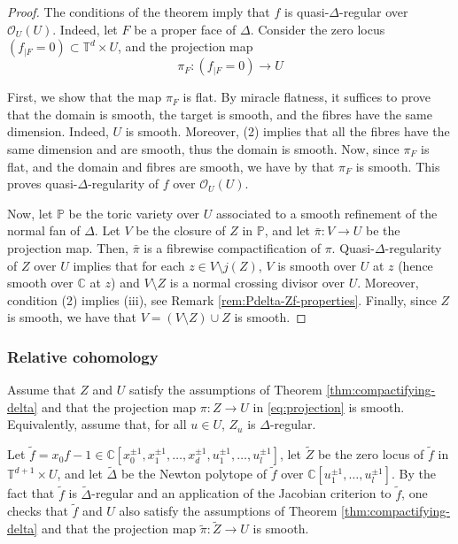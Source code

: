 \documentclass[11pt, reqno]{amsart}
\theoremstyle{plain}
\theoremstyle{definition}
\newcommand{\CC}{\mathbb{C}}
\newcommand{\OO}{\mathcal{O}}
\newcommand{\TT}{\mathbb{T}}
\newcommand{\bs}{}
\begin{document}
\begin{proof}
The conditions of the theorem imply that  $\bs f$ is quasi-$\Delta$-regular over $\OO_{\bs{U}}(\bs{U})$. Indeed, let $F$ be a 
proper 
face of $\Delta$. Consider the zero locus $(\bs f_{|F}=0) \subset \TT^d \times \bs U$, and the projection map 
\[{\bs \pi}_F \colon (\bs f_{|F}=0) \to \bs{U}\] 

First, we show that the map ${\bs \pi}_F$ is flat. 
By miracle flatness, it suffices to prove that the domain is smooth, the target is smooth, and the fibres have the same dimension. 
Indeed, $U$ is smooth. 
Moreover, (2) implies that all the fibres have the same dimension and are smooth, thus the domain is smooth. 
Now, since ${\bs \pi}_F$ is flat, and the domain and fibres are smooth, we have by \cite[Theorem 10.2]{Hart} that ${\bs \pi}_F$ is smooth. 
This proves quasi-$\Delta$-regularity of $\bs f$ over $\OO_{\bs{U}}(\bs{U})$.

Now, let $\mathbb{P}$ be the toric variety over $\bs{U}$ associated to a smooth refinement of the normal fan of $\Delta$. Let $\bs V$ be the closure of $\bs Z$ in $\mathbb{P}$, and let $\bar{\bs \pi} \colon \bs V \to \bs U$ be the projection map. Then, $\bar{\bs \pi}$  is a fibrewise compactification of $\bs \pi$. 
Quasi-$\Delta$-regularity of $\bs Z$ over $\bs U$ implies that for each $z \in \bs V \setminus j(Z)$, $V$ is smooth over $\bs U$ at $z$ (hence smooth over $\CC$ at $z$) and $V\setminus Z$ is a normal crossing divisor over $\bs U$. Moreover, condition (2) implies (iii), see Remark \ref{rem:Pdelta-Zf-properties}. 
Finally, since $Z$ is smooth, we have that $V= \left( V\setminus Z\right) \cup Z$ is smooth.
\end{proof}


\subsubsection{Relative cohomology}\label{subsec:relative-coho}  
Assume that $Z$ and $U$ satisfy the assumptions of Theorem  \ref{thm:compactifying-delta} and that the projection map $\pi \colon Z \to U$ in \eqref{eq:projection} is smooth. Equivalently, assume that, for all $u \in U$, $Z_u$ is $\Delta$-regular. 

Let $\widetilde{f}=x_0f-1 \in \CC[x_0^{\pm 1}, x_1^{\pm 1},\dots,x_d^{\pm 1}, u_1^{\pm 1},\dots, u_l^{\pm 1}]$, let $\widetilde{Z}$ be the zero locus of $\widetilde{f}$ in $\TT^{d+1} \times U$, and let $\widetilde{\Delta}$ be the Newton polytope of $\widetilde{f}$ over $\CC[u_1^{\pm1},\dots, u_l^{\pm1}].$ 
By the fact that $\widetilde{f}$ is $\tilde{\Delta}$-regular and an application of the Jacobian criterion to $\widetilde{f}$, one checks that $\widetilde{f}$ and $U$ also satisfy the assumptions of Theorem \ref{thm:compactifying-delta} and that the projection map $\widetilde{\pi} \colon \widetilde{Z} \to U$ is smooth. 
\end{document}
